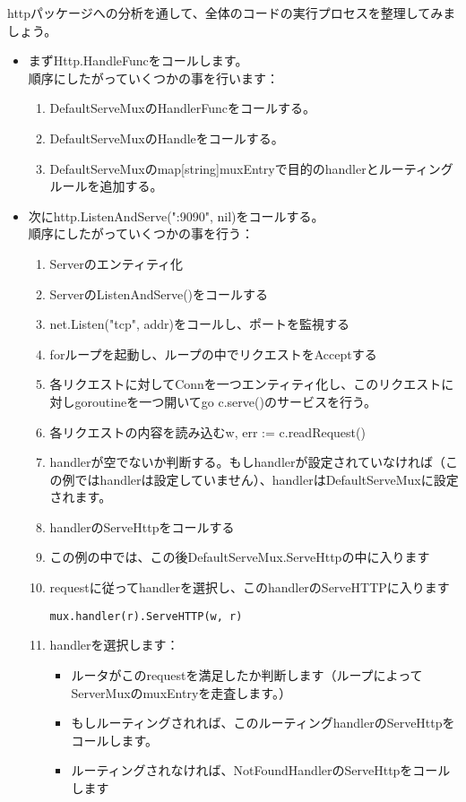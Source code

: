 httpパッケージへの分析を通して、全体のコードの実行プロセスを整理してみましょう。

\begin{itemize}
  \item まずHttp.HandleFuncをコールします。\\ 順序にしたがっていくつかの事を行います：
  \begin{enumerate}
  \item DefaultServeMuxのHandlerFuncをコールする。
  \item DefaultServeMuxのHandleをコールする。
  \item DefaultServeMuxのmap[string]muxEntryで目的のhandlerとルーティングルールを追加する。
  \end{enumerate}
  \item 次にhttp.ListenAndServe(":9090", nil)をコールする。\\ 順序にしたがっていくつかの事を行う：
  \begin{enumerate}
  \item Serverのエンティティ化
  \item ServerのListenAndServe()をコールする
  \item net.Listen("tcp", addr)をコールし、ポートを監視する
  \item forループを起動し、ループの中でリクエストをAcceptする
  \item 各リクエストに対してConnを一つエンティティ化し、このリクエストに対しgoroutineを一つ開いてgo c.serve()のサービスを行う。
  \item 各リクエストの内容を読み込むw, err := c.readRequest()
  \item handlerが空でないか判断する。もしhandlerが設定されていなければ（この例ではhandlerは設定していません）、handlerはDefaultServeMuxに設定されます。
  \item handlerのServeHttpをコールする
  \item この例の中では、この後DefaultServeMux.ServeHttpの中に入ります
  \item requestに従ってhandlerを選択し、このhandlerのServeHTTPに入ります
    \begin{lstlisting}[numbers=none]
mux.handler(r).ServeHTTP(w, r)
  \end{lstlisting}
  \item handlerを選択します：
\begin{itemize}
  \item ルータがこのrequestを満足したか判断します（ループによってServerMuxのmuxEntryを走査します。）
  \item もしルーティングされれば、このルーティングhandlerのServeHttpをコールします。
  \item ルーティングされなければ、NotFoundHandlerのServeHttpをコールします
\end{itemize}
  \end{enumerate}
\end{itemize}
